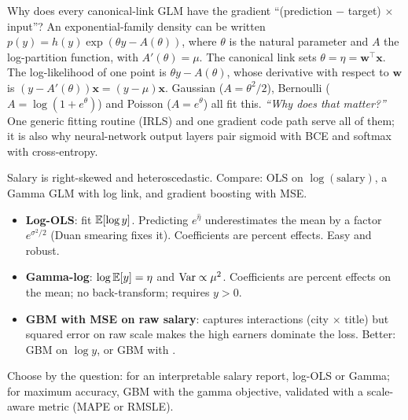 \begin{qa}{\deep Why does every canonical-link GLM have the gradient ``(prediction $-$ target) $\times$ input''?}
\why An exponential-family density can be written $p(y) = h(y)\exp(\theta y - A(\theta))$, where $\theta$ is the natural
parameter and $A$ the log-partition function, with $A'(\theta) = \mu$. The canonical link sets $\theta = \eta = \mathbf
w^\top\mathbf x$. The log-likelihood of one point is $\theta y - A(\theta)$, whose derivative with respect to $\mathbf w$ is
$(y - A'(\theta))\mathbf x = (y - \mu)\mathbf x$. Gaussian ($A = \theta^2/2$), Bernoulli ($A = \log(1+e^\theta)$) and
Poisson ($A = e^\theta$) all fit this.
\pushes \emph{``Why does that matter?''} One generic fitting routine (IRLS) and one gradient code path serve all of them;
it is also why neural-network output layers pair sigmoid with BCE and softmax with cross-entropy.
\end{qa}

\begin{qa}{\deep Salary is right-skewed and heteroscedastic. Compare: OLS on $\log(\text{salary})$, a Gamma GLM with log link,
and gradient boosting with MSE.}
\why
\begin{itemize}
\item \textbf{Log-OLS}: fit $\mathbb{E}[\log y]$. Predicting $e^{\hat\eta}$ underestimates the mean by a factor $e^{\sigma^2/2}$
  (Duan smearing fixes it). Coefficients are percent effects. Easy and robust.
\item \textbf{Gamma-log}: $\log\mathbb{E}[y] = \eta$ and $\operatorname{Var}\propto\mu^2$. Coefficients are percent effects on the mean; no
  back-transform; requires $y > 0$.
\item \textbf{GBM with MSE on raw salary}: captures interactions (city $\times$ title) but squared error on raw scale makes
  the high earners dominate the loss. Better: GBM on $\log y$, or GBM with .
\end{itemize}
Choose by the question: for an interpretable salary report, log-OLS or Gamma; for maximum accuracy, GBM with the gamma
objective, validated with a scale-aware metric (MAPE or RMSLE).
\end{qa}

